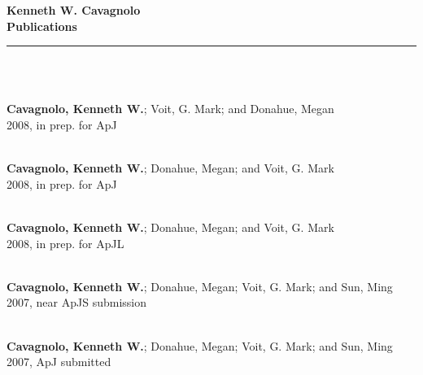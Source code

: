 \documentclass[12pt]{cv}
\begin{document}
\begin{center}
{\huge \textbf{\sc Kenneth W. Cavagnolo\\ \large Publications}}\\
\rule{17.35cm}{1pt}\\
\end{center}
\normalsize

\begin{llist}



{}\\
{\bf Cavagnolo, Kenneth W.}; Voit, G. Mark; and Donahue, Megan\\
2008, in prep. for ApJ

{}\\
{\bf Cavagnolo, Kenneth W.}; Donahue, Megan; and Voit, G. Mark\\
2008, in prep. for ApJ

{}\\
{\bf Cavagnolo, Kenneth W.}; Donahue, Megan; and Voit, G. Mark\\
2008, in prep. for ApJL

{}\\
{\bf Cavagnolo, Kenneth W.}; Donahue, Megan; Voit, G. Mark; and Sun, Ming\\
2007, near ApJS submission

{}\\
{\bf Cavagnolo, Kenneth W.}; Donahue, Megan; Voit, G. Mark; and Sun, Ming\\
2007, ApJ submitted




\end{llist}
\end{document}
